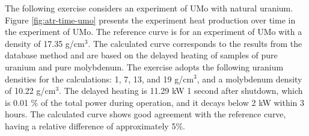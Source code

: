 
The following exercise considers an experiment of UMo with natural uranium.
Figure \ref{fig:atr-time-umo} presents the experiment heat production over time in the experiment of UMo.
The reference curve is for an experiment of UMo with a density of 17.35 g/cm$^3$.
The calculated curve corresponds to the results from the database method and are based on the delayed heating of samples of pure uranium and pure molybdenum.
The exercise adopts the following uranium densities for the calculations: 1, 7, 13, and 19 g/cm$^3$, and a molybdenum density of 10.22 g/cm$^3$.
The delayed heating is 11.29 kW 1 second after shutdown, which is 0.01 \% of the total power during operation, and it decays below 2 kW within 3 hours.
The calculated curve shows good agreement with the reference curve, having a relative difference of approximately 5\%.

